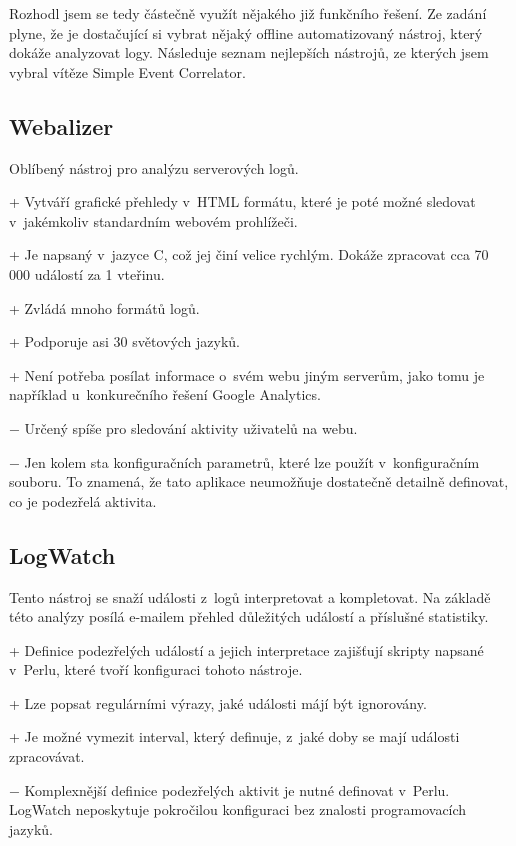 \documentclass[thesis=B,czech]{FITthesis}[2012/06/26]
\begin{document}
Rozhodl jsem se tedy částečně využít nějakého již funkčního řešení. Ze zadání plyne, že je dostačující si vybrat nějaký offline automatizovaný nástroj, který dokáže analyzovat logy. Následuje seznam nejlepších nástrojů, ze kterých jsem vybral vítěze Simple Event Correlator.

\subsection{Webalizer}
Oblíbený nástroj pro analýzu serverových logů. \cite{webalizer, webalizerReadme}
	
+ Vytváří grafické přehledy v~HTML formátu, které je poté možné sledovat v~jakémkoliv standardním webovém prohlížeči.
	
+ Je napsaný v~jazyce C, což jej činí velice rychlým. Dokáže zpracovat cca 70 000 událostí za 1 vteřinu. 

+ Zvládá mnoho formátů logů.

+ Podporuje asi 30 světových jazyků.

+ Není potřeba posílat informace o~svém webu jiným serverům, jako tomu je například u~konkurečního řešení Google Analytics.

$-$ Určený spíše pro sledování aktivity uživatelů na webu.

$-$ Jen kolem sta konfiguračních parametrů, které lze použít v~konfiguračním souboru. To znamená, že tato aplikace neumožňuje dostatečně detailně definovat, co je podezřelá aktivita.

\subsection{LogWatch}
Tento nástroj se snaží události z~logů interpretovat a kompletovat. Na základě této analýzy posílá e-mailem přehled důležitých událostí a příslušné statistiky. \cite{logwatch}	

+ Definice podezřelých událostí a jejich interpretace zajišťují skripty napsané v~Perlu, které tvoří konfiguraci tohoto nástroje.

+ Lze popsat regulárními výrazy, jaké události májí být ignorovány.

+ Je možné vymezit interval, který definuje, z~jaké doby se mají události zpracovávat.

$-$ Komplexnější definice podezřelých aktivit je nutné definovat v~Perlu. LogWatch neposkytuje pokročilou konfiguraci bez znalosti programovacích jazyků.
\end{document}

